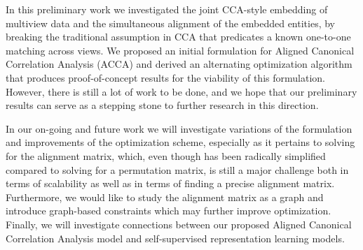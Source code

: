 In this preliminary work we investigated the joint CCA-style embedding of multiview data and the simultaneous alignment of the embedded entities, by breaking the traditional assumption in CCA that predicates a known one-to-one matching across views. We proposed an initial formulation for Aligned Canonical Correlation Analysis (ACCA) and derived an alternating optimization algorithm that produces proof-of-concept results for the viability of this formulation. However, there is still a lot of work to be done, and we hope that our preliminary results can serve as a stepping stone to further research in this direction.

In our on-going and future work we will investigate variations of the formulation and improvements of the optimization scheme, especially as it pertains to solving for the alignment matrix, which, even though has been radically simplified compared to solving for a permutation matrix, is still a major challenge both in terms of scalability as well as in terms of finding a precise alignment matrix. Furthermore, we would like to study the alignment matrix as a graph and introduce graph-based constraints which may further improve optimization.
Finally, we will investigate connections between our proposed Aligned Canonical Correlation Analysis model and self-supervised representation learning models.